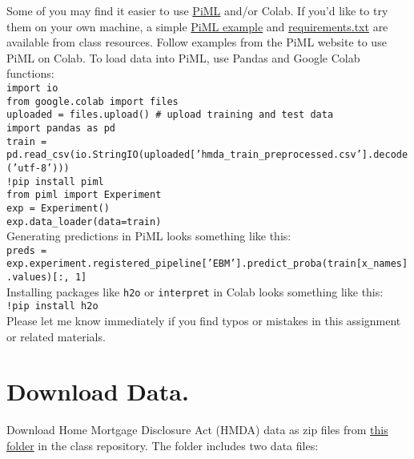 \documentclass[fleqn]{article}
\begin{document}
\noindent Some of you may find it easier to use \href{https://selfexplainml.github.io/PiML-Toolbox/_build/html/index.html}{PiML} and/or Colab. If you'd like to try them on your own machine, a simple \href{https://github.com/jphall663/GWU_rml/blob/master/assignments/assignment_1/group6_PiML_example.ipynb}{PiML example} and \href{https://github.com/jphall663/GWU_rml/blob/master/assignments/assignment_1/piml_requirements.txt}{requirements.txt} are available from class resources. Follow examples from the PiML website to use PiML on Colab. To load data into PiML, use Pandas and Google Colab functions:\\
\noindent \texttt{import io}\\
\noindent \texttt{from google.colab import files}\\
\noindent \texttt{uploaded = files.upload() \# upload training and test data}\\
\noindent \texttt{import pandas as pd}\\
\noindent \texttt{train = pd.read\_csv(io.StringIO(uploaded['hmda\_train\_preprocessed.csv'].decode('utf-8')))}\\
\noindent \texttt{!pip install piml}\\
\noindent \texttt{from piml import Experiment}\\
\noindent \texttt{exp = Experiment()}\\
\noindent \texttt{exp.data\_loader(data=train)}\\

\noindent Generating predictions in PiML looks something like this:\\
\noindent \texttt{preds = exp.experiment.registered\_pipeline['EBM'].predict\_proba(train[x\_names].values)[:, 1]}\\

\noindent Installing packages like \texttt{h2o} or \texttt{interpret} in Colab looks something like this:\\
\noindent  \texttt{!pip install h2o}\\ 

\noindent Please let me know immediately if you find typos or mistakes in this assignment or related materials. 

\section{Download Data.}

Download Home Mortgage Disclosure Act (HMDA) data as zip files from \href{https://github.com/jphall663/GWU_rml/tree/master/assignments/data}{this folder} in the class repository. The folder includes two data files:
\end{document}
